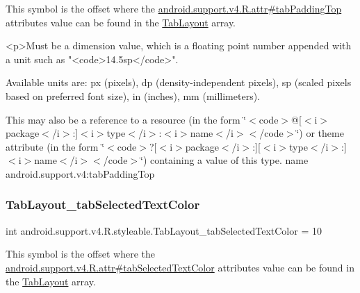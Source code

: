 This symbol is the offset where the \hyperlink{classandroid_1_1support_1_1v4_1_1R_1_1attr_a52d18671529e90af8baacabe3fb145f5}{android.\+support.\+v4.\+R.\+attr\#tab\+Padding\+Top} attribute\textquotesingle{}s value can be found in the \hyperlink{classandroid_1_1support_1_1v4_1_1R_1_1styleable_a48e866d7121b40ef0bb3d467759606a9}{Tab\+Layout} array.

\begin{DoxyVerb}      <p>Must be a dimension value, which is a floating point number appended with a unit such as "<code>14.5sp</code>".
\end{DoxyVerb}
 Available units are\+: px (pixels), dp (density-\/independent pixels), sp (scaled pixels based on preferred font size), in (inches), mm (millimeters). 

This may also be a reference to a resource (in the form \char`\"{}$<$code$>$@\mbox{[}$<$i$>$package$<$/i$>$\+:\mbox{]}$<$i$>$type$<$/i$>$\+:$<$i$>$name$<$/i$>$$<$/code$>$\char`\"{}) or theme attribute (in the form \char`\"{}$<$code$>$?\mbox{[}$<$i$>$package$<$/i$>$\+:\mbox{]}\mbox{[}$<$i$>$type$<$/i$>$\+:\mbox{]}$<$i$>$name$<$/i$>$$<$/code$>$\char`\"{}) containing a value of this type.  name android.\+support.\+v4\+:tab\+Padding\+Top \mbox{\label{classandroid_1_1support_1_1v4_1_1R_1_1styleable_a1fc04f3779f703c9f532046d056698cd}} 
\subsubsection{\texorpdfstring{Tab\+Layout\+\_\+tab\+Selected\+Text\+Color}{TabLayout\_tabSelectedTextColor}}
{\footnotesize\ttfamily int android.\+support.\+v4.\+R.\+styleable.\+Tab\+Layout\+\_\+tab\+Selected\+Text\+Color = 10\hspace{0.3cm}{\ttfamily [static]}}

This symbol is the offset where the \hyperlink{classandroid_1_1support_1_1v4_1_1R_1_1attr_a785cc6ac834de1b16151d47714ba0b08}{android.\+support.\+v4.\+R.\+attr\#tab\+Selected\+Text\+Color} attribute\textquotesingle{}s value can be found in the \hyperlink{classandroid_1_1support_1_1v4_1_1R_1_1styleable_a48e866d7121b40ef0bb3d467759606a9}{Tab\+Layout} array.

